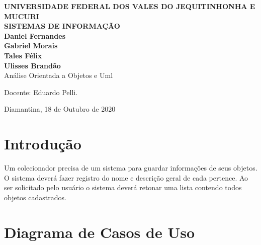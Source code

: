 \documentclass[a4paper]{article}
\begin{document}
  \begin{titlepage}
    \vfill
      \begin{center}
        {\large \textbf{UNIVERSIDADE FEDERAL DOS VALES DO JEQUITINHONHA E MUCURI}} \\[0.5cm]
        {\large \textbf{SISTEMAS DE INFORMAÇÃO}} \\[2cm]
    
        {\large \textbf{Daniel Fernandes}}\\[0.4cm]
        {\large \textbf{Gabriel Morais}}\\[0.4cm]
        {\large \textbf{Tales Félix}}\\[0.4cm]
        {\large \textbf{Ulisses Brandão}}\\[4cm]
    
        {\Large Análise Orientada a Objetos e Uml}\\[4cm]
    
        \hspace{.45\textwidth} %
        \begin{minipage}{.5\textwidth}
        \large
        Docente: Eduardo Pelli.\\[8cm]
    \end{minipage}
    {\large Diamantina, 18 de Outubro de 2020}
    \end{center}
  \end{titlepage}


  \newpage
    \section{Introdução}
    Um colecionador precisa de um sistema para guardar informações de seus objetos.
    O sistema deverá fazer registro do nome e descrição geral de cada pertence.
    Ao ser solicitado pelo usuário o sistema deverá retonar uma lista contendo
    todos objetos cadastrados.
    
    
    
    \section{Diagrama de Casos de Uso}
\end{document}
